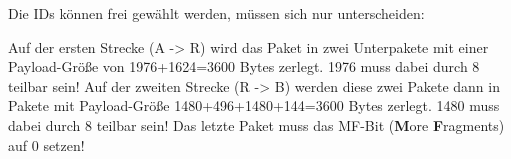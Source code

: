 
Die IDs können frei gewählt werden, müssen sich nur unterscheiden:

\begin{flushleft}
\end{flushleft}
\bigbreak

Auf der ersten Strecke (A -> R) wird das Paket in zwei Unterpakete mit einer Payload-Größe von 1976+1624=3600 Bytes zerlegt.
1976 muss dabei durch 8 teilbar sein!
Auf der zweiten Strecke (R -> B) werden diese zwei Pakete dann in Pakete mit Payload-Größe 1480+496+1480+144=3600 Bytes zerlegt.
1480 muss dabei durch 8 teilbar sein!
Das letzte Paket muss das MF-Bit (\textbf{M}ore \textbf{F}ragments) auf 0 setzen!